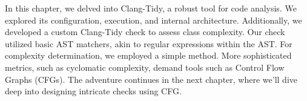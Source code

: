 In this chapter, we delved into Clang-Tidy, a robust tool for code analysis. We explored its configuration, execution, and internal architecture. Additionally, we developed a custom Clang-Tidy check to assess class complexity. Our check utilized basic AST matchers, akin to regular expressions within the AST. For complexity determination, we employed a simple method. More sophisticated metrics, such as cyclomatic complexity, demand tools such as Control Flow Graphs (CFGs). The adventure continues in the next chapter, where we'll dive deep into designing intricate checks using CFG.

